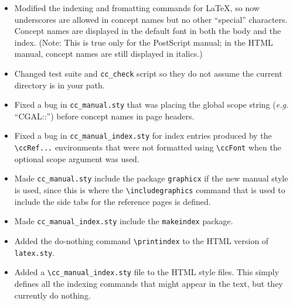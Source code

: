 \documentclass[11pt]{article}
\begin{document}
\begin{description}
\begin{itemize}
              used by \LaTeX.  If 
              \verb|LATEX_CONV_INPUTS| is set, files are searched for in the
              indicated directories in the indicated order; if not set, files
              are searched for in the current directory.
       \item  Modified the indexing and fromatting commands for \LaTeX, so
              now underscores are allowed in concept names but no other 
              ``special'' characters.  Concept names are displayed in the 
              default font in both the body and the index. (Note: This
              is true only for the PostScript manual; in the HTML manual,
              concept names are still displayed in italics.)
       \item  Changed test suite and {\tt cc\_check} script so they do
              not assume the current directory is in your path.
       \item  Fixed a bug in \verb|cc_manual.sty| that was placing the global
              scope string ({\em e.g.} ``CGAL::'') before concept names in page 
              headers.
       \item  Fixed a bug in \verb|cc_manual_index.sty| for index entries 
              produced by the \verb|\ccRef...| environments that were not
              formatted using \verb|\ccFont| when the optional scope argument
              was used.
       \item  Made \verb|cc_manual.sty| include the package \verb|graphicx| if
              the new manual style is used, since this is where the 
              \verb|\includegraphics| command that is used to include the side 
              tabs for the reference pages is defined.
       \item  Made \verb|cc_manual_index.sty| include the \verb|makeindex| 
              package.
       \item  Added the do-nothing command \verb|\printindex| to 
              the HTML version of \verb|latex.sty|.
       \item  Added a \verb|\cc_manual_index.sty| file to the HTML style files.
              This simply defines all the indexing commands that might appear
              in the text, but they currently do nothing.
    \end{itemize}



\end{description}
\end{document}
